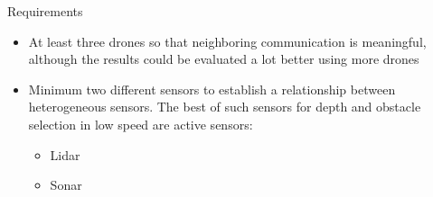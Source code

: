 \documentclass[unknownkeysallowed]{beamer}
\begin{document}
	\begin{frame}{Requirements}
		\begin{itemize}
			\item At least three drones so that neighboring communication is meaningful, although the results could be evaluated a lot better using more drones
			\item Minimum two different sensors to establish a relationship between heterogeneous sensors. The best of such sensors for depth and obstacle selection in low speed are active sensors: 
			\begin{itemize}
				\item Lidar
				\item Sonar
			\end{itemize}
		\end{itemize}
	\end{frame}
\end{document}
